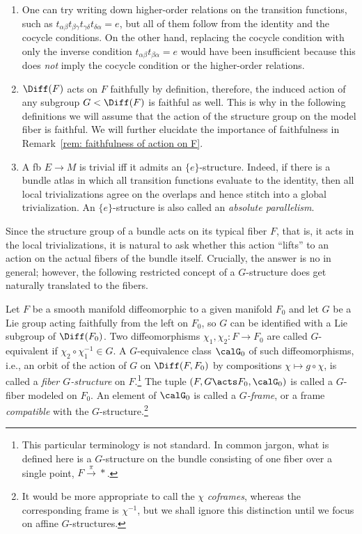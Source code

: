 \begin{rem}\label{rem: faithful action on F 0}
    \begin{enumerate}
        \item One can try writing down higher-order relations on the transition functions, such as $t_{\alpha\beta}t_{\beta\gamma}t_{\gamma\delta}t_{\delta\alpha}=e$, but all of them follow from the identity and the cocycle conditions. On the other hand, replacing the cocycle condition with only the inverse condition $t_{\alpha\beta}t_{\beta\alpha}=e$ would have been insufficient because this does \emph{not} imply the cocycle condition or the higher-order relations.
        \item $\Diff(F)$ acts on $F$ faithfully by definition, therefore, the induced action of any subgroup $G<\Diff(F)$ is faithful as well. This is why in the following definitions we will assume that the action of the structure group on the model fiber is faithful. We will further elucidate the importance of faithfulness in Remark~\ref{rem: faithfulness of action on F}.
        \item A \gls{fb} $E\to M$ is trivial iff it admits an $\{e\}$-structure. Indeed, if there is a bundle atlas in which all transition functions evaluate to the identity, then all local trivializations agree on the overlaps and hence stitch into a global trivialization. An $\{e\}$-structure is also called an \emph{absolute parallelism}.
    \end{enumerate}
\end{rem}


Since the structure group of a bundle acts on its typical fiber $F$, that is, it acts in the local trivializations, it is natural to ask whether this action ``lifts'' to an action on the actual fibers of the bundle itself. Crucially, the answer is no in general; however, the following restricted concept of a $G$-structure does get naturally translated to the fibers.

\begin{defn}[$G$-fiber]
    Let $F$ be a smooth manifold diffeomorphic to a given manifold $F_0$ and let $G$ be a Lie group acting faithfully from the left on $F_0$, so $G$ can be identified with a Lie subgroup of $\Diff(F_0)$. Two diffeomorphisms $\chi_1,\chi_2:F\to F_0$ are called $G$-equivalent if $\chi_2\circ \chi_1^{-1}\in G$. A $G$-equivalence class $\calG_0$ of such diffeomorphisms, i.e., an orbit of the action of $G$ on $\Diff(F,F_0)$ by compositions $\chi\mapsto g\circ \chi$, is called a \emph{fiber $G$-structure} on $F$.\footnote{This particular terminology is not standard. In common jargon, what is defined here is a $G$-structure on the bundle consisting of one fiber over a single point, $F\overset{\pi}{\to}\ast$.} The tuple $(F,G\acts F_0,\calG_0)$ is called a $G$-fiber modeled on $F_0$. An element of $\calG_0$ is called a \emph{$G$-frame}, or a frame \emph{compatible} with the $G$-structure.\footnote{It would be more appropriate to call the $\chi$ \emph{coframes}, whereas the corresponding frame is $\chi^{-1}$, but we shall ignore this distinction until we focus on affine $G$-structures.} 
\end{defn}


